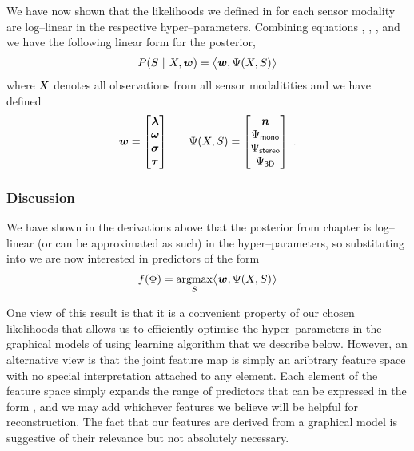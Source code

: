 We have now shown that the likelihoods we defined in 
for each sensor modality are log--linear in the respective
hyper--parameters. Combining equations ,
, ,
and  we have the following linear form for
the posterior,
\begin{equation}
  P(\Seam ~|~ X, \Model)
  =
  \bigl\langle
    \Model, \JointFtr(\Observations,\Seam)
  \bigr\rangle
\end{equation}
where $\Observations$ denotes all observations from all sensor
modalitities and we have defined
\begin{align}
  \Model = \begin{bmatrix}
    \Penalties \\
    \PixelModel \\
    \StereoModel \\
    \IndModel
  \end{bmatrix}
  & \quad &
  \JointFtr(\Observations,\Seam) = \begin{bmatrix}
    \Counts \\
    \JointFtr_{\textsf{mono}} \\
    \JointFtr_{\textsf{stereo}} \\
    \JointFtr_{\textsf{3D}}
  \end{bmatrix}~.
\end{align}

\subsubsection{Discussion}

We have shown in the derivations above that the posterior from chapter
 is log--linear (or can be approximated as such) in
the hyper--parameters, so substituting  into
 we are now interested in predictors of the form
\begin{equation}
  \label{eq:linear-predictor}
  \Predictor(\Features) = 
  \argmax_{\Seam}\limits
  \bigl\langle
    \Model, \JointFtr(\Observations,\Seam)
  \bigr\rangle
\end{equation}

One view of this result is that it is a convenient property of our
chosen likelihoods that allows us to efficiently optimise the
hyper--parameters in the graphical models of  using
learning algorithm that we describe below. However, an alternative
view is that the joint feature map is simply an aribtrary feature
space with no special interpretation attached to any element. Each
element of the feature space simply expands the range of predictors
that can be expressed in the form , and we
may add whichever features we believe will be helpful for
reconstruction. The fact that our features are derived from a
graphical model is suggestive of their relevance but not absolutely
necessary.

